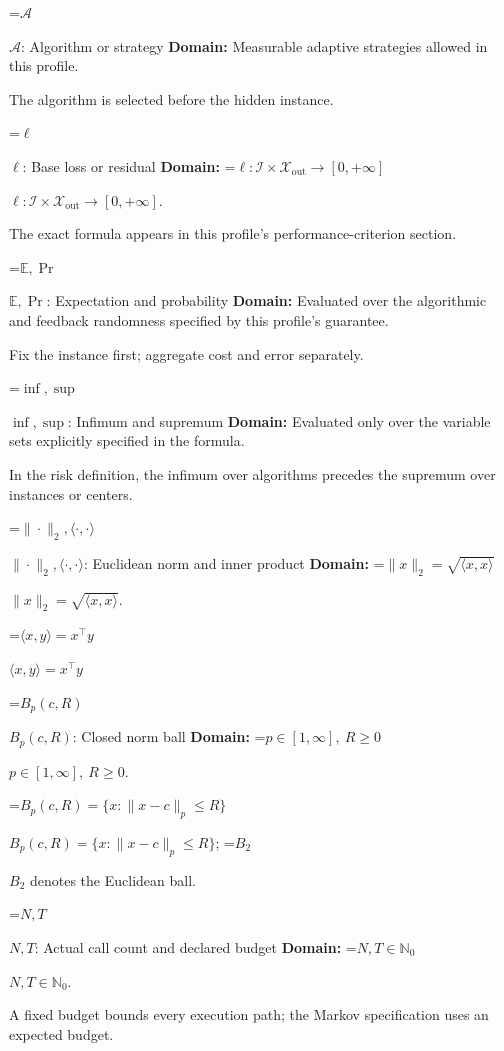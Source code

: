\documentclass[10pt,a4paper]{article}
\newcommand{\AtlasMath}[1]{\par\begingroup\centering\setbox0=\hbox{$\displaystyle #1$}\ifdim\wd0>1.4\linewidth\typeout{ATLAS WIDE FORMULA: \the\wd0}\fi\ifdim\wd0>\linewidth\resizebox{\linewidth}{!}{\box0}\else\box0\fi\par\endgroup}
\newcommand{\AtlasInlineMath}[1]{\begingroup\setbox0=\hbox{$#1$}\ifdim\wd0>.4\linewidth\endgroup\AtlasMath{#1}\else\endgroup$#1$\fi}
\begin{document}
\AtlasInlineMath{\mathcal{A}}: Algorithm or strategy \textbf{Domain:} Measurable adaptive strategies allowed in this profile.



The algorithm is selected before the hidden instance.



\AtlasInlineMath{\ell}: Base loss or residual \textbf{Domain:} \AtlasInlineMath{\ell:\mathcal{I}\times\mathcal{X}_{\mathrm{out}}\to[0,+\infty]}.



The exact formula appears in this profile's performance-criterion section.



\AtlasInlineMath{\mathbb{E},\Pr}: Expectation and probability \textbf{Domain:} Evaluated over the algorithmic and feedback randomness specified by this profile's guarantee.



Fix the instance first; aggregate cost and error separately.



\AtlasInlineMath{\inf,\sup}: Infimum and supremum \textbf{Domain:} Evaluated only over the variable sets explicitly specified in the formula.



In the risk definition, the infimum over algorithms precedes the supremum over instances or centers.



\AtlasInlineMath{\|\cdot\|_2,\langle\cdot,\cdot\rangle}: Euclidean norm and inner product \textbf{Domain:} \AtlasInlineMath{\|x\|_2=\sqrt{\langle x,x\rangle}}.



\AtlasInlineMath{\langle x,y\rangle=x^\top y}



\AtlasInlineMath{B_p(c,R)}: Closed norm ball \textbf{Domain:} \AtlasInlineMath{p\in[1,\infty],\ R\ge0}.



\AtlasInlineMath{B_p(c,R)=\{x:\|x-c\|_p\le R\}}; \AtlasInlineMath{B_2} denotes the Euclidean ball.



\AtlasInlineMath{N,T}: Actual call count and declared budget \textbf{Domain:} \AtlasInlineMath{N,T\in\mathbb{N}_0}.



A fixed budget bounds every execution path; the Markov specification uses an expected budget.
\end{document}
